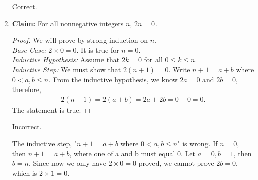 \documentclass{article}\usepackage{amsmath,amssymb,amsthm,tikz,tkz-graph,color,chngpage,soul,hyperref,csquotes,graphicx,floatrow, yfonts}\newcommand*{\QEDB}{\hfill\ensuremath{\square}}\newtheorem*{prop}{Proposition}\renewcommand{\theenumi}{\alph{enumi}}\usepackage[shortlabels]{enumitem}\usepackage[nobreak=true, framemethod=tikz]{mdframed}\usetikzlibrary{matrix,calc, automata, positioning}\MakeOuterQuote{"}\usepackage[margin=1in]{geometry} \newtheorem{theorem}{Theorem}
\begin{document}
\begin{enumerate}
    \begin{mdframed}
    Correct.
    \end{mdframed}

    \item
        \textbf{Claim:} For all nonnegative integers $n$, $2n=0$.
        \begin{proof}
            We will prove by strong induction on $n$.   \\
            \emph{Base Case:} $2 \times 0 = 0$. It is true for $n=0$.   \\
            \emph{Inductive Hypothesis:} Assume that $2k=0$ for all $0 \le k \le n$.    \\
            \emph{Inductive Step:} We must show that $2(n+1)=0$. Write $n+1 = a+b$ where $0 < a,b \le n$.
            From the inductive hypothesis, we know $2a = 0$ and $2b=0$, therefore,
            \begin{align*}
                2(n+1) = 2(a+b) = 2a + 2b = 0+0 =0.
            \end{align*}
            The statement is true.
        \end{proof}
        
    \begin{mdframed}
    Incorrect. \par
    The inductive step, "$n + 1 = a + b $ where $  0 < a, b \leq n$" is wrong. If $n = 0$, then $n + 1 = a + b$, where one of a and b must equal 0. Let $a = 0, b = 1$, then $b = n$. Since now we only have $2 \times 0 = 0$ proved, we cannot prove $2b = 0$, which is $2\times1 = 0$.
    \end{mdframed}
\end{enumerate}

\pagebreak
\end{document}
